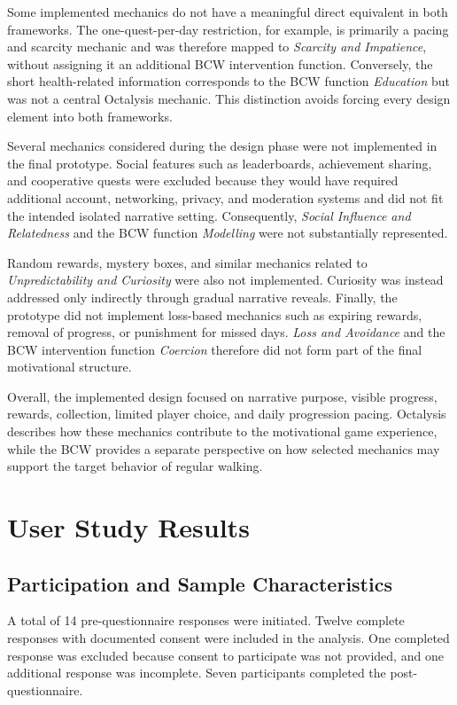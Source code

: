 Some implemented mechanics do not have a meaningful direct equivalent in both frameworks. The one-quest-per-day restriction, for example, is primarily a pacing and scarcity mechanic and was therefore mapped to \textit{Scarcity and Impatience}, without assigning it an additional BCW intervention function. Conversely, the short health-related information corresponds to the BCW function \textit{Education} but was not a central Octalysis mechanic. This distinction avoids forcing every design element into both frameworks.

Several mechanics considered during the design phase were not implemented in the final prototype. Social features such as leaderboards, achievement sharing, and cooperative quests were excluded because they would have required additional account, networking, privacy, and moderation systems and did not fit the intended isolated narrative setting. Consequently, \textit{Social Influence and Relatedness} and the BCW function \textit{Modelling} were not substantially represented.

Random rewards, mystery boxes, and similar mechanics related to \textit{Unpredictability and Curiosity} were also not implemented. Curiosity was instead addressed only indirectly through gradual narrative reveals. Finally, the prototype did not implement loss-based mechanics such as expiring rewards, removal of progress, or punishment for missed days. \textit{Loss and Avoidance} and the BCW intervention function \textit{Coercion} therefore did not form part of the final motivational structure.

Overall, the implemented design focused on narrative purpose, visible progress, rewards, collection, limited player choice, and daily progression pacing. Octalysis describes how these mechanics contribute to the motivational game experience, while the BCW provides a separate perspective on how selected mechanics may support the target behavior of regular walking.

\section{User Study Results}

\subsection{Participation and Sample Characteristics}

A total of 14 pre-questionnaire responses were initiated. Twelve complete responses with documented consent were included in the analysis. One completed response was excluded because consent to participate was not provided, and one additional response was incomplete. Seven participants completed the post-questionnaire.

